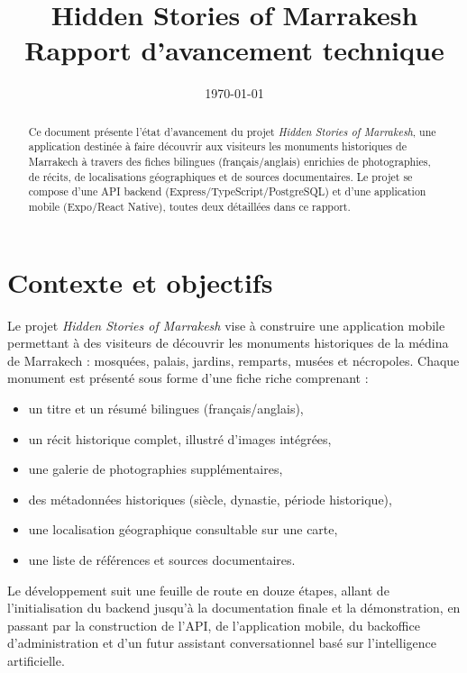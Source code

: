 \documentclass[11pt,a4paper]{article}
\title{\textbf{Hidden Stories of Marrakesh}\\[0.3em]\large Rapport d'avancement technique}
\author{}
\date{\today}
\begin{document}
\maketitle
\thispagestyle{empty}

\begin{abstract}
\noindent
Ce document présente l'état d'avancement du projet \emph{Hidden Stories of Marrakesh}, une application destinée à faire découvrir aux visiteurs les monuments historiques de Marrakech à travers des fiches bilingues (français/anglais) enrichies de photographies, de récits, de localisations géographiques et de sources documentaires. Le projet se compose d'une API backend (Express/TypeScript/PostgreSQL) et d'une application mobile (Expo/React Native), toutes deux détaillées dans ce rapport.
\end{abstract}

\tableofcontents
\newpage

\section{Contexte et objectifs}

Le projet \emph{Hidden Stories of Marrakesh} vise à construire une application mobile permettant à des visiteurs de découvrir les monuments historiques de la médina de Marrakech : mosquées, palais, jardins, remparts, musées et nécropoles. Chaque monument est présenté sous forme d'une fiche riche comprenant :

\begin{itemize}[nosep]
    \item un titre et un résumé bilingues (français/anglais),
    \item un récit historique complet, illustré d'images intégrées,
    \item une galerie de photographies supplémentaires,
    \item des métadonnées historiques (siècle, dynastie, période historique),
    \item une localisation géographique consultable sur une carte,
    \item une liste de références et sources documentaires.
\end{itemize}

Le développement suit une feuille de route en douze étapes, allant de l'initialisation du backend jusqu'à la documentation finale et la démonstration, en passant par la construction de l'API, de l'application mobile, du backoffice d'administration et d'un futur assistant conversationnel basé sur l'intelligence artificielle.
\end{document}
